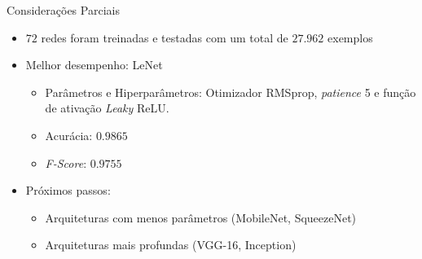 
\begin{frame}{Considerações Parciais}
  \begin{itemize}
    \item $72$ redes foram treinadas e testadas com um total de $27.962$ exemplos
    \pause
    \bigskip
    \item Melhor desempenho: LeNet
    \begin{itemize}
      \item \alert{Parâmetros e Hiperparâmetros}: Otimizador RMSprop, \emph{patience} 5 e função de ativação \emph{Leaky} ReLU.
      \item \alert{Acurácia}: $0.9865$
      \item \alert{\emph{F-Score}}: $0.9755$
    \end{itemize}
    \pause
    \bigskip
    \item Próximos passos:
    \begin{itemize}
      \item Arquiteturas com menos parâmetros (MobileNet, SqueezeNet)
      \item Arquiteturas mais profundas (VGG-16, Inception)
    \end{itemize}
  \end{itemize}
\end{frame}
